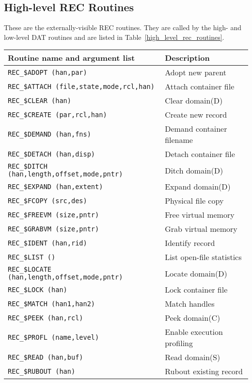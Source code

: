 \clearpage
\subsection {High-level REC Routines}

These are the externally-visible REC routines. They are called by the high-
and low-level DAT routines and are listed in
Table~\ref{high_level_rec_routines}.

\begin {table}[htbp]
\begin {center}
\begin {tabular}{||l|l||}
\hline
Routine name and argument list	& Description \\
\hline
{\tt REC\_\$ADOPT (han,par)}	& Adopt new parent \\
{\tt REC\_\$ATTACH (file,state,mode,rcl,han)} & Attach container file \\
{\tt REC\_\$CLEAR (han)}	& Clear domain(D) \\
{\tt REC\_\$CREATE (par,rcl,han)} & Create new record \\
{\tt REC\_\$DEMAND (han,fns)}	& Demand container filename \\
{\tt REC\_\$DETACH (han,disp)}	& Detach container file \\
{\tt REC\_\$DITCH (han,length,offset,mode,pntr)} & Ditch domain(D) \\
{\tt REC\_\$EXPAND (han,extent)} & Expand domain(D) \\
{\tt REC\_\$FCOPY (src,des)}	& Physical file copy \\
{\tt REC\_\$FREEVM (size,pntr)} & Free virtual memory  \\
{\tt REC\_\$GRABVM (size,pntr)} & Grab virtual memory  \\
{\tt REC\_\$IDENT (han,rid)}	& Identify record \\
{\tt REC\_\$LIST ()}		& List open-file statistics \\
{\tt REC\_\$LOCATE (han,length,offset,mode,pntr)} & Locate domain(D) \\
{\tt REC\_\$LOCK (han)}		& Lock container file \\
{\tt REC\_\$MATCH (han1,han2)}	& Match handles \\
{\tt REC\_\$PEEK (han,rcl)}	& Peek domain(C) \\
{\tt REC\_\$PROFL (name,level)}	& Enable execution profiling \\
{\tt REC\_\$READ (han,buf)}	& Read domain(S) \\
{\tt REC\_\$RUBOUT (han)}	& Rubout existing record \\

\end{tabular}
\end{center}
\end{table}
